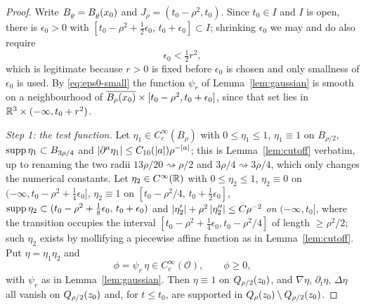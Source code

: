 \documentclass[11pt,reqno]{amsart}
\begin{document}
\begin{proof}
Write $B_{\varrho}=B_{\varrho}(x_{0})$ and $J_{\rho}=(t_{0}-\rho^{2},t_{0})$.
Since $t_{0}\in I$ and $I$ is open, there is $\epsilon_{0}>0$ with
$[t_{0}-\rho^{2}+\tfrac12\epsilon_{0},\,t_{0}+\epsilon_{0}]\subset I$; shrinking
$\epsilon_{0}$ we may and do also require
\begin{equation}\label{eq:eps0-small}
  \epsilon_{0}<\tfrac12 r^{2},
\end{equation}
which is legitimate because $r>0$ is fixed before $\epsilon_{0}$ is chosen and
only smallness of $\epsilon_{0}$ is used. By \eqref{eq:eps0-small} the function
$\psi_{r}$ of Lemma~\ref{lem:gaussian} is smooth on a neighbourhood of
$\overline{B_{\rho}(x_{0})}\times[t_{0}-\rho^{2},t_{0}+\epsilon_{0}]$, since
that set lies in $\mathbb{R}^{3}\times(-\infty,t_{0}+r^{2})$.

\emph{Step 1: the test function.} Let $\eta_{1}\in C_{c}^{\infty}(B_{\rho})$ with
$0\le\eta_{1}\le1$, $\eta_{1}\equiv1$ on $B_{\rho/2}$,
$\operatorname{supp}\eta_{1}\subset B_{3\rho/4}$ and
$\left\lvert \partial^{a}\eta_{1} \right\rvert\le C_{10}(\left\lvert a \right\rvert)\rho^{-\left\lvert a \right\rvert}$; this is
Lemma~\ref{lem:cutoff} verbatim, up to renaming the two radii
$13\rho/20\rightsquigarrow\rho/2$ and $3\rho/4\rightsquigarrow3\rho/4$, which
only changes the numerical constants. Let $\eta_{2}\in C^{\infty}(\mathbb{R})$ with
$0\le\eta_{2}\le1$, $\eta_{2}\equiv0$ on
$(-\infty,t_{0}-\rho^{2}+\tfrac14\epsilon_{0}]$, $\eta_{2}\equiv1$ on
$[t_{0}-\rho^{2}/4,\,t_{0}+\tfrac12\epsilon_{0}]$, $\operatorname{supp}\eta_{2}\subset
(t_{0}-\rho^{2}+\tfrac18\epsilon_{0},\,t_{0}+\epsilon_{0})$ and
$\left\lvert \eta_{2}' \right\rvert+\rho^{2}\left\lvert \eta_{2}'' \right\rvert\le C\rho^{-2}$ \emph{on}
$(-\infty,t_{0}]$, where the transition occupies the interval
$[t_{0}-\rho^{2}+\tfrac14\epsilon_{0},t_{0}-\rho^{2}/4]$ of length
$\ge\rho^{2}/2$; such $\eta_{2}$ exists by mollifying a piecewise affine
function as in Lemma~\ref{lem:cutoff}. Put $\eta=\eta_{1}\eta_{2}$ and
\[
  \phi=\psi_{r}\,\eta\in C_{c}^{\infty}(\mathcal{O}),\qquad \phi\ge0 ,
\]
with $\psi_{r}$ as in Lemma~\ref{lem:gaussian}. Then $\eta\equiv1$ on
$Q_{\rho/2}(z_{0})$, and $\nabla\eta$, $\partial_{t}\eta$, $\Delta\eta$ all
vanish on $Q_{\rho/2}(z_{0})$ and, for $t\le t_{0}$, are supported in
$Q_{\rho}(z_{0})\setminus Q_{\rho/2}(z_{0})$.


\end{proof}
\end{document}
